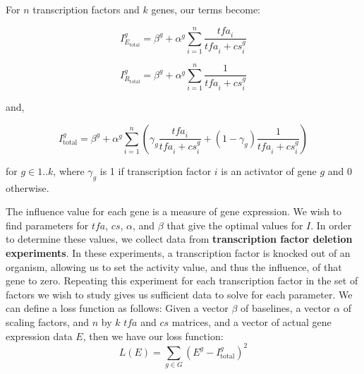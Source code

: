 \documentclass[paper=a4, fontsize=11pt]{scrartcl} %
\newcommand{\tfa}{\textit{tfa}}
\newcommand{\cs}{\textit{cs}}
\begin{document}
For $n$ transcription factors and $k$ genes, our terms become:

\[ I_{E_\text{total}}^g = \beta^g + \alpha^g \sum_{i=1}^n{\frac{\tfa_i}{\tfa_i + \cs_i^g}} \]

\[ I_{R_\text{total}}^g = \beta^g + \alpha^g \sum_{i=1}^n{\frac{1}{\tfa_i + \cs_i^g}} \]

and,

\[ I_{\text{total}}^g = \beta^g + \alpha^g \sum_{i=1}^n{ \left(\gamma_g \frac{\tfa_i}{\tfa_i + \cs_i^g} + (1 - \gamma_g) \frac{1}{\tfa_i + \cs_i^g} \right)} \]

for $g \in 1..k$, where $\gamma_g$ is 1 if transcription factor $i$ is an activator of gene $g$ and 0 otherwise. 

The influence value for each gene is a measure of gene expression. We wish to find parameters for $\tfa$, $\cs$, $\alpha$, and $\beta$ that give the optimal values for $I$. In order to determine these values, we collect data from \textbf{transcription factor deletion experiments}. In these experiments, a transcription factor is knocked out of an organism, allowing us to set the activity value, and thus the influence, of that gene to zero. Repeating this experiment for each transcription factor in the set of factors we wish to study gives us sufficient data to solve for each parameter.
\newline\newline
We can define a loss function as follows: Given a vector $\beta$ of baselines, a vector $\alpha$ of scaling factors, and $n$ by $k$ $\tfa$ and $\cs$ matrices, and a vector of actual gene expression data $E$, then we have our loss function:
\[L(E) = \sum_{g \in G}{\left(E^g - I_{\text{total}}^g\right)^2} \]
\end{document}
